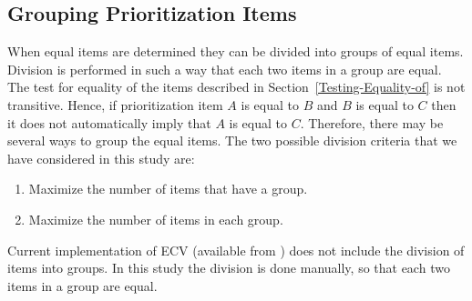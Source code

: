\subsection{Grouping Prioritization Items}
When equal items are determined they can be divided into groups of equal items. Division is performed in such a way that each two items in a group are equal. The test for equality of the items described in Section~\ref{Testing-Equality-of} is not transitive. Hence, if prioritization item $A$ is equal to $B$ and $B$ is equal to $C$ then it does not automatically imply that $A$ is equal to $C$. Therefore, there may be several ways to group the equal items. The two possible division criteria that we have considered in this study are:

\begin{enumerate}
\item Maximize the number of items that have a group.
\item Maximize the number of items in each group.
\end{enumerate}

Current implementation of ECV (available from \cite{Rinkevics2011}) does not include the division of items into groups.
In this study the division is done manually, so that each two items in a group are equal.


